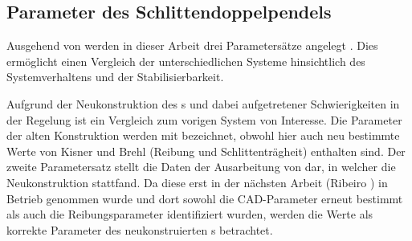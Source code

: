 \subsection{Parameter des Schlittendoppelpendels}\label{subsec:spdparams}

Ausgehend von  werden in dieser Arbeit drei Parametersätze angelegt .
Dies ermöglicht einen Vergleich der unterschiedlichen Systeme hinsichtlich des Systemverhaltens und der Stabilisierbarkeit.

Aufgrund der Neukonstruktion des \dpd s und dabei aufgetretener Schwierigkeiten in der Regelung ist ein Vergleich zum vorigen System von Interesse.
Die Parameter der alten Konstruktion werden mit  bezeichnet, obwohl hier auch neu bestimmte Werte von Kisner \cite{kisner} und Brehl \cite{brehl} (Reibung und Schlittenträgheit) enthalten sind.
Der zweite Parametersatz  stellt die Daten der Ausarbeitung von \cite{chang} dar, in welcher die Neukonstruktion stattfand. 
Da diese erst in der nächsten Arbeit (Ribeiro \cite{ribeiro}) in Betrieb genommen wurde und dort sowohl die CAD-Parameter erneut bestimmt als auch die Reibungsparameter identifiziert wurden, werden die Werte  als korrekte Parameter des neukonstruierten \dpd s betrachtet.

